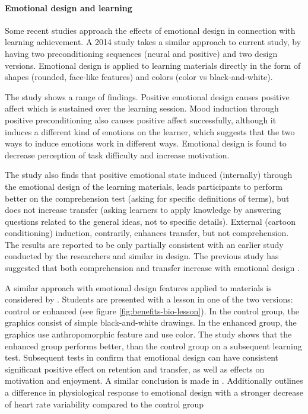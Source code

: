 		\paragraph{Emotional design and learning} 
		
		Some recent studies approach the effects of emotional design in connection with learning achievement. A 2014 study takes a similar approach to current study, by having two preconditioning sequences (neural and positive) and two design versions. Emotional design is applied to learning materials directly in the form of shapes (rounded, face-like features) and colors (color vs black-and-white).
		
		The study shows a range of findings. Positive emotional design causes positive affect which is sustained over the learning session. Mood induction through positive preconditioning also causes positive affect successfully, although it induces a different kind of emotions on the learner, which suggests that the two ways to induce emotions work in different ways. 
		Emotional design is found to decrease perception of task difficulty and increase motivation.
		
		The study also finds that positive emotional state induced (internally) through the emotional design of the learning materials, leads participants to perform better on the comprehension test (asking for specific definitions of terms), but does not increase transfer (asking learners to apply knowledge by answering questions related to the general ideas, not to specific details). External (cartoon conditioning) induction, contrarily, enhances transfer, but not comprehension.
		The results are reported to be only partially consistent with an earlier study conducted by the researchers and similar in design. The previous study has suggested that both comprehension and transfer increase with emotional design \cite{Plass2014, Plass2016}.
		
		A similar approach with emotional design features applied to materials is considered by \cite{Mayer2014}. Students are presented with a lesson in one of the two versions: control or enhanced (see figure \ref{fig:benefits-bio-lesson}). In the control group, the graphics consist of simple black-and-white drawings. In the enhanced group, the graphics use anthropomorphic feature and use color. The study shows that the enhanced group performs better, than the control group on a subsequent learning test. Subsequent tests in \cite{Brom2018} confirm that emotional design can have consistent significant positive effect on retention and transfer, as well as effects on motivation and enjoyment.
		A similar conclusion is made in \cite{Le2018}. Additionally \cite{Le2018} outlines a difference in physiological response to emotional design with a stronger decrease of heart rate variability compared to the control group


